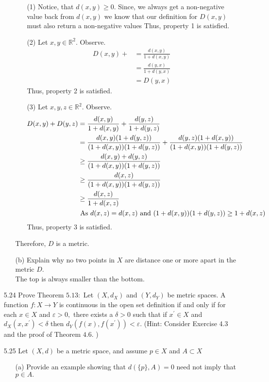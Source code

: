 \documentclass[12pt]{article}
\newcommand{\R}{\mathbb{R}}
\begin{document}
\begin{enumerate}
\begin{enumerate}
		\begin{enumerate}
			\item[(1)] Notice, that $ d(x,y)\geq0 $. Since, we always get a non-negative value back from $ d(x,y) $ we know that our definition for $ D(x,y) $ must also return a non-negative values
			Thus, property 1 is satisfied.
			\item[(2)] Let $ x,y\in\R^2 $. Observe.
			\begin{align*}
			D(x,y) +  &= \frac{d(x,y)}{1+d(x,y)}\\
				   &= \frac{d(y,x)}{1+d(y,x)}\\
				   &= D(y,x)
			\end{align*}
			Thus, property 2 is satisfied.
			\item[(3)] Let $ x,y,z\in\R^2 $. Observe.
			\begin{align*}
			D(x,y)+D(y,z) &= \frac{d(x,y)}{1+d(x,y)} + \frac{d(y,z)}{1+d(y,z)} \\
						  &= \frac{d(x,y)(1+d(y,z))}{(1+d(x,y))(1+d(y,z))} + \frac{d(y,z)(1+d(x,y))}{(1+d(x,y))(1+d(y,z))}\\
						  &\geq \frac{d(x,y)+d(y,z)}{(1+d(x,y))(1+d(y,z))}\\
						  &\geq \frac{d(x,z)}{(1+d(x,y))(1+d(y,z))}\\
						  &\geq \frac{d(x,z)}{1+d(x,z)} \\
						  &\text{ As $ d(x,z)=d(x,z)  $ and $ (1+d(x,y))(1+d(y,z)) \geq 1+d(x,z)$ }
			\end{align*}
			Thus, property 3 is satisfied.
		\end{enumerate}
		Therefore, $D$ is a metric.
		\item[(b)] Explain why no two points in $X$ are distance one or more apart in the metric $D .$\\
		The top is always smaller than the bottom.
	\end{enumerate}
	
	\item[5.24] Prove Theorem $5.13 :$ Let $\left( X , d _ { X } \right)$ and $\left( Y , d _ { Y } \right)$ be metric spaces. A function
	$f : X \rightarrow Y$ is continuous in the open set definition if and only if for each $x \in X$ and $\varepsilon > 0 ,$ there exists a $\delta > 0$ such that if $x ^ { \prime } \in X$ and $d_X \left( x , x ^ { \prime } \right) < \delta$
	then $d _ { Y } \left( f ( x ) , f \left( x ^ { \prime } \right) \right) < \varepsilon .$ (Hint: Consider Exercise 4.3 and the proof of
	Theorem $4.6 .$ )
	
	\item[5.25] Let $( X , d )$ be a metric space, and assume $p \in X$ and $A \subset X$
	\begin{enumerate}
		\item[(a)] Provide an example showing that $d ( \{ p \} , A ) = 0$ need not imply that $p \in A .$
		

\end{enumerate}
\end{enumerate}
\end{document}
